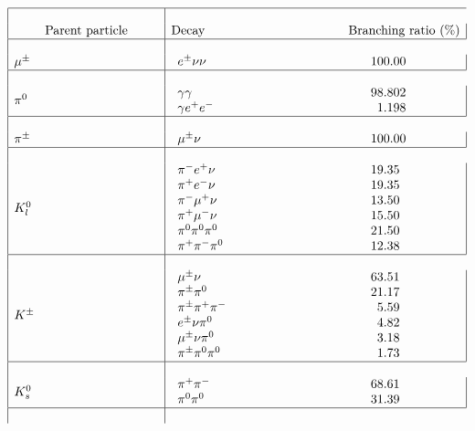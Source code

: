 \[
\begin{array}{|l|l|}
\hline
\makebox[4cm][|l|]{Parent particle} &
\makebox[8cm][c|]{Decay \hfill Branching ratio (\%)} \\ \hline

\mu^{\pm}      &
\begin{array}{lr}
\makebox[5cm][l]{$e^{\pm}\nu\nu$}        &  100.00
\end{array} \\ \hline

\pi^{0}        &
\begin{array}{lr}
\makebox[5cm][l]{$\gamma\gamma$}         &  98.802   \\
\gamma e^+e^-          &  1.198
\end{array} \\ \hline

\pi^{\pm}      &
\begin{array}{lr}
\makebox[5cm][l]{$\mu^{\pm}\nu$}         &  100.00 \\
\end{array} \\ \hline

K^0_{l}        &
\begin{array}{lr}
\makebox[5cm][l]{$\pi^- e^+ \nu$}        &  19.35    \\
\pi^+ e^- \nu          &  19.35    \\
\pi^-\mu^+\nu          &  13.50    \\
\pi^+\mu^-\nu          &  15.50    \\
\pi^0\pi^0\pi^0        &  21.50    \\
\pi^+\pi^-\pi^0        &  12.38
\end{array} \\ \hline

K^{\pm}        &
\begin{array}{lr}
\makebox[5cm][l]{$\mu^{\pm}\nu$}         & 63.51     \\
\pi^{\pm}\pi^0         & 21.17     \\
\pi^{\pm}\pi^+\pi^-    &  5.59     \\
e^{\pm}\nu\pi^0        &  4.82     \\
\mu^{\pm}\nu\pi^0      &  3.18     \\
\pi^{\pm}\pi^0\pi^0    &  1.73
\end{array} \\ \hline

K^0_s          &
\begin{array}{lr}
\makebox[5cm][l]{$\pi^+\pi^-$}           &  68.61    \\
\pi^0\pi^0             &  31.39
\end{array} \\ \hline


\end{array}\]
